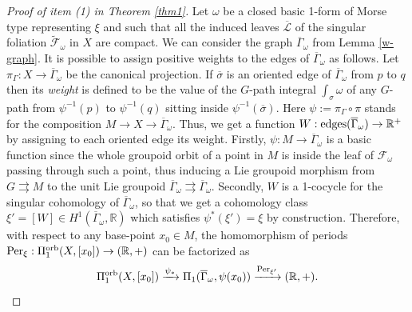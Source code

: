 \documentclass[
  a4paper, 
  reqno, 
  oneside, 
  12pt
]{amsart}
\newtheorem{theorem}{Theorem}[section]
\theoremstyle{definition}
\theoremstyle{remark}
\newcommand{\rr}{\rightrightarrows}
\begin{document}
\begin{proof}[Proof of item (1) in Theorem \ref{thm1}]
	





 Let $\omega$ be a closed basic 1-form of Morse type representing $\xi$ and such that all the induced leaves $\overline{\mathcal{L}}$ of the singular foliation $\tilde{\mathcal{F}}_\omega$ in $X$ are compact. We can consider the graph $\overline{\Gamma}_\omega$ from  Lemma \ref{w-graph}. It is possible to assign positive weights to the edges of $\overline{\Gamma}_\omega$ as follows. Let $\pi_{\Gamma}:X\to \overline{\Gamma}_\omega$ be the canonical projection. If $\overline{\sigma}$ is an oriented edge of $\overline{\Gamma}_\omega$ from $p$ to $q$ then its \emph{weight} is defined to be the value of the $G$-path integral $\int_{\sigma}\omega$ of any $G$-path from $\psi^{-1}(p)$ to $\psi^{-1}(q)$ sitting inside $\psi^{-1}(\overline{\sigma})$. Here $\psi:= \pi_{\Gamma}\circ \pi$ stands for the composition $M\to X\to \overline{\Gamma}_\omega$. Thus, we get a function $W:\textnormal{edges}(\overline{\Gamma}_\omega)\to \mathbb{R}^+$ by assigning to each oriented edge its weight. Firstly, $\psi:M\to \overline{\Gamma}_\omega$ is a basic function since the whole groupoid orbit of a point in $M$ is inside the leaf of $\mathcal{F}_\omega$ passing through such a point, thus inducing a Lie groupoid morphism from $G\rr M$ to the unit Lie groupoid $\overline{\Gamma}_\omega\rr \overline{\Gamma}_\omega$. Secondly, $W$ is a 1-cocycle for the singular cohomology of $\overline{\Gamma}_\omega$, so that we get a cohomology class $\xi'=[W]\in H^1(\overline{\Gamma}_\omega,\mathbb{R})$ which satisfies $\psi^\ast (\xi')=\xi$ by construction. Therefore, with respect to any base-point $x_0\in M$, the homomorphism of periods $\textnormal{Per}_\xi:\Pi_1^{\textnormal{orb}}(X,[x_0])\to (\mathbb{R},+)$ can be factorized as 
$$\Pi_1^{\textnormal{orb}}(X,[x_0])\xrightarrow[]{\it \psi_\ast} \Pi_1(\overline{\Gamma}_\omega, \psi(x_0)) \xrightarrow[]{\it \textnormal{Per}_{\xi'}} (\mathbb{R},+).$$


\end{proof}
\end{document}
